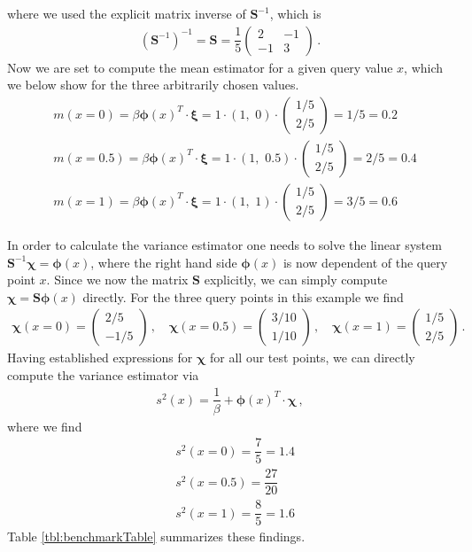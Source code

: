 \documentclass[11pt, DINA4, fleqn]{amsart}
\begin{document}
where we used the explicit matrix inverse of $\bm{S}^{-1}$, which is
\begin{align}
(\bm{S}^{-1})^{-1} = \bm{S} = \dfrac{1}{5}\begin{pmatrix}
2 & -1 \\ -1 & 3
\end{pmatrix}\, .
\end{align}
Now we are set to compute the mean estimator for a given query value $x$, which we below show for the three arbitrarily chosen values.
\begin{align}
&m(x = 0) = \beta\bm{\phi}(x)^T \cdot \bm{\xi} = 1 \cdot (1 ,\, \, 0) \cdot \begin{pmatrix}
1/5 \\ 2/5
\end{pmatrix} = 1/5 = 0.2 \\
&m(x = 0.5) = \beta\bm{\phi}(x)^T \cdot \bm{\xi} = 1 \cdot (1 ,\, \, 0.5) \cdot \begin{pmatrix}
1/5 \\ 2/5
\end{pmatrix} = 2/5 = 0.4\\
&m(x = 1) = \beta\bm{\phi}(x)^T \cdot \bm{\xi} = 1 \cdot (1 ,\, \, 1) \cdot \begin{pmatrix}
1/5 \\ 2/5
\end{pmatrix} = 3/5 = 0.6
\end{align}

In order to calculate the variance estimator one needs to solve the linear system $\bm{S}^{-1} \bm{\chi} = \bm{\phi}(x)$, where the right hand side $\bm{\phi}(x)$ is now dependent of the query point $x$. Since we now the matrix $\bm{S}$ explicitly, we can simply compute $\bm{\chi} = \bm{S}\bm{\phi}(x)$ directly. For the three query points in this example we find
\begin{align}
\bm{\chi}(x = 0) = \begin{pmatrix}2/5 \\ -1/5\end{pmatrix} \, ,
\quad
\bm{\chi}(x = 0.5) = \begin{pmatrix}3/10 \\ 1/10\end{pmatrix} \, ,
\quad
\bm{\chi}(x = 1) = \begin{pmatrix}1/5 \\ 2/5\end{pmatrix} \, .
\end{align}
Having established expressions for $\bm{\chi}$ for all our test points, we can directly compute the variance estimator via
\begin{align}
s^2(x) = \dfrac{1}{\beta} + \bm{\phi}(x)^T \cdot \bm{\chi} \, ,
\end{align}
where we find
\begin{align}
&s^2(x = 0) = \dfrac{7}{5} = 1.4 \\ 
&s^2(x = 0.5) = \dfrac{27}{20} \\
&s^2(x = 1) = \dfrac{8}{5} = 1.6
\end{align}
Table \ref{tbl:benchmarkTable} summarizes these findings.
\end{document}
